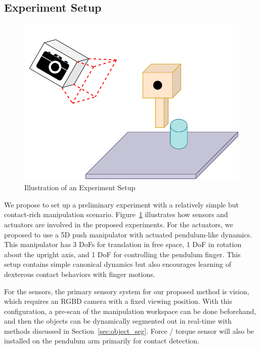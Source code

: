 \documentclass[conference]{IEEEtran}
\begin{document}
\subsection{Experiment Setup}
\begin{figure}[hbt]
  \centering
  \includegraphics[width=.45\textwidth]{experiment}
  \caption{Illustration of an Experiment Setup}
  \label{fig:exp_setup}
\end{figure}
We propose to set up a preliminary experiment with a relatively simple but
contact-rich manipulation scenario. Figure~\ref{fig:exp_setup} illustrates
how sensors and actuators are involved in the proposed experiments. For the
actuators, we proposed to use a 5D push manipulator with actuated pendulum-like
dynamics. This manipulator has 3 DoFs for translation in free space, 1 DoF in
rotation about the upright axis, and 1 DoF for controlling the pendulum finger.
This setup contains simple canonical dynamics but also encourages learning
of dexterous contact behaviors with finger motions.

For the sensors, the primary sensory system for our proposed method is vision,
which requires an RGBD camera with a fixed viewing position. With this configuration,
a pre-scan of the manipulation workspace can be done beforehand, and then
the objects can be dynamically segmented out in real-time with methods discussed
in Section~\ref{sec:object_seg}. Force / torque sensor will also be installed
on the pendulum arm primarily for contact detection.
\end{document}
